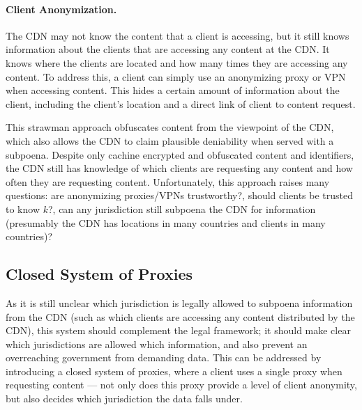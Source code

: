 \paragraph{Client Anonymization.}  The CDN may not know the content that a client is accessing, but it 
still knows information about the clients that are accessing any content at the CDN.  It knows 
where the clients are located and how many times they are accessing any content.  To address this, 
a client can simply use an anonymizing proxy or VPN when accessing content.  This hides a certain 
amount of information about the client, including the client's location and a direct link of 
client to content request.

This strawman approach obfuscates content from the viewpoint of the CDN, which also allows the CDN 
to claim plausible deniability when served with a subpoena.  Despite only cachine encrypted and obfuscated 
content and identifiers, the CDN still has knowledge of which clients are requesting any content and how often 
they are requesting content.  Unfortunately, this approach raises 
many questions: are anonymizing proxies/VPNs trustworthy?, should clients be trusted to know $k$?, 
can any jurisdiction still subpoena the CDN for information (presumably the CDN has locations in many 
countries and clients in many countries)?


\subsection{Closed System of Proxies}
\label{sec:proxies}
As it is still unclear which jurisdiction is legally allowed to subpoena information from the CDN (such as which 
clients are accessing any content distributed by the CDN), this 
system should complement the legal framework; it should make clear which jurisdictions are allowed 
which information, and also prevent an overreaching government from demanding data.  This 
can be addressed by introducing a closed system of proxies, where a client uses a single proxy when requesting 
content --- not only does this proxy provide a level of client anonymity, but also decides which jurisdiction 
the data falls under.  


